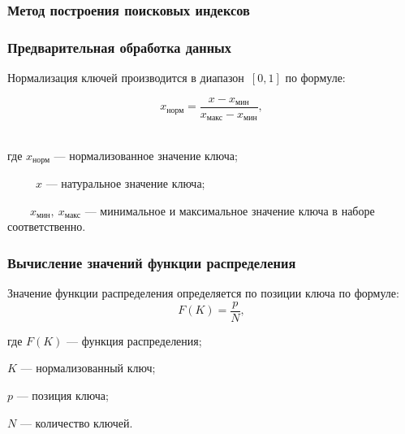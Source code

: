 \documentclass[8pt]{bmstu-pr}
\begin{document}
\begin{frame}
    \frametitle{Метод построения поисковых индексов}
    \vspace{-1.25cm}
\end{frame}

\begin{frame}
    \fontsize{22pt}{22pt}\selectfont
    \frametitle{Предварительная обработка данных}

    \begin{minipage}{0.25\textwidth}
    \end{minipage} \hfill
    \begin{minipage}{0.70\textwidth}
    \parbox[t]{\linewidth}{
        Нормализация ключей производится в \mbox{диапазон}~$[0, 1]$ по формуле:

        \begin{equation*}
            x_{\text{норм}}= \frac{x - x_{\text{мин}}}{x_{\text{макс}} -
            x_{\text{мин}}},
        \end{equation*}

        ~\\
        где $x_{\text{норм}}$ --- нормализованное значение ключа;

        ~~~~~$x$ --- натуральное значение ключа;

        ~~~~$x_{\text{мин}},~x_{\text{макс}}$ --- минимальное и
        \mbox{максимальное} значение ключа в наборе
        \mbox{соответственно}.
    }
    \end{minipage}
\end{frame}

\begin{frame}
    \fontsize{20pt}{20pt}\selectfont
    \frametitle{Вычисление значений функции распределения}
    \begin{minipage}{0.40\textwidth}
    \parbox[t]{\linewidth}{
    Значение функции \mbox{распределения} \mbox{определяется} по позиции
    ключа по формуле:
    \begin{equation*}
        F(K)  = \frac{p}{N},
    \end{equation*}

    где $F(K)$ --- функция
    \mbox{распределения};

    $K$ --- нормализованный ключ;

    $p$ --- позиция ключа;

    $N$ --- количество ключей.
    }
    \end{minipage}
    \begin{minipage}{0.50\textwidth}
    \end{minipage}
\end{frame}
\end{document}
